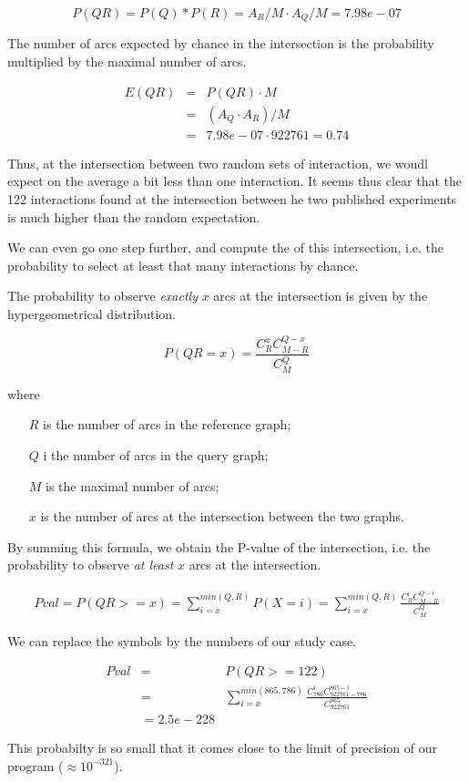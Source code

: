 \begin{enumerate}
\[P(QR) = P(Q)*P(R) = A_R/M \cdot A_Q/M = 7.98e-07\]

The number of arcs expected by chance in the intersection is the
probability multiplied by the maximal number of arcs.

\begin{eqnarray*}
E(QR) & = & P(QR) \cdot M  \\
 & = & (A_Q \cdot A_R)/M \\
 & = &  7.98e-07 \cdot 922761 = 0.74
\end{eqnarray*}

Thus, at the intersection between two random sets of interaction, we
woudl expect on the average a bit less than one interaction. It seems
thus clear that the 122 interactions found at the intersection between
he two published experiments is much higher than the random
expectation.

We can even go one step further, and compute the 
of this intersection, i.e. the probability to select at least that
many interactions by chance. 

The probability to observe \textit{exactly} $x$ arcs at the
intersection is given by the hypergeometrical distribution.

\begin{equation}
\label{eq:hypergeometric_density}
P(QR=x)=\frac{C^{x}_{R}C^{Q-x}_{M-R}}{C^Q_{M}}
\end{equation}

where 
\begin{itemize}
\item[$R$] is the number of arcs in the reference graph;
\item[$Q$] i the number of arcs in the query graph;
\item[$M$] is the maximal number of arcs;
\item[$x$] is the number of arcs at the intersection between the two
  graphs.
\end{itemize}

By summing this formula, we obtain the P-value of the intersection,
i.e. the probability to observe \textit{at least} $x$ arcs at the
intersection.

\begin{eqnarray*}
\label{eq:hypergeometric_density_cdf}
Pval = P(QR>=x)=\sum_{i=x}^{min(Q,R)}P(X=i)=\sum_{i=x}^{min(Q,R)} \frac{C^i_{R}C^{Q-i}_{M-R}}{C^Q_{M}}
\end{eqnarray*}

We can replace the symbols by the numbers of our study case.

\begin{eqnarray*}
\label{eq:hypergeometric_density_cdf}
Pval & = & P(QR>=122) \\
 & = & \sum_{i=x}^{min(865,786)} \frac{C^i_{786}C^{865-i}_{922761-786}}{C^{865}_{922761}}  \\
 & =  2.5e-228
\end{eqnarray*}

This probabilty is so small that it comes close to the limit of
precision of our program ($\approx 10^{-321}$).

\end{enumerate}

